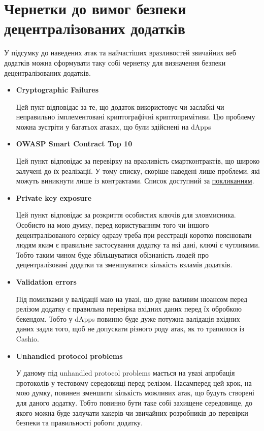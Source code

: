\chapter{Чернетки до вимог безпеки децентралізованих додатків}

У підсумку до наведених атак та найчастіших вразливостей звичайних веб додатків можна сформувати таку собі чернетку для визначення безпеки децентралізованих додатків.

\begin{itemize}
    \item \textbf{Cryptographic Failures}
    
        Цей пукт відповідає за те, що додаток використовує чи заслабкі чи неправильно імплементовані криптографічні криптопримітиви. Цю проблему можна зустріти у багатьох атаках, що були здійснені на dApps

    \item \textbf{OWASP Smart Contract Top 10}
    
        Цей пункт відповідає за перевірку на вразливість смартконтрактів, що широко залучені до їх реалізації. У тому списку, скоріше наведені лише проблеми, які можуть виникнути лише із контрактами. Список доступний за \href{https://owasp.org/www-project-smart-contract-top-10/}{покликанням}.

    \item \textbf{Private key exposure}
    
        Цей пункт відповідає за розкриття особистих ключів для зловмисника. Особисто на мою думку, перед користуванням того чи іншого децентралізованого сервісу одразу треба при реєстрації коротко пояснювати людям яким є правильне застосування додатку та які дані, ключі є чутливими. Тобто таким чином буде збільшуватися обізнаність людей про децентралізовані додатки та зменшуватися кількість взламів додатків.

    \item \textbf{Validation errors}
    
        Під помилками у валідації маю на увазі, що дуже валивим нюансом перед релізом додатку є правильна перевірка вхідних даних перед їх обробкою бекендом. Тобто у dApps повинно буде дуже потужна валідація вхідних даних задля того, щоб не допускати різного роду атак, як то трапилося із Cashio.        
        
    \item \textbf{Unhandled protocol problems}
    
        У даному під unhandled protocol problems мається на увазі апробація протоколів у тестовому середовищі перед релізом. Насамперед цей крок, на мою думку, повинен зменшити кількість можливих атак, що будуть створені для даного додатку. Тобто повинно бути таке собі захищене середовище, до якого можна буде залучати хакерів чи звичайних розробників до перевірки безпеки та правильності роботи додатку.

\end{itemize}

